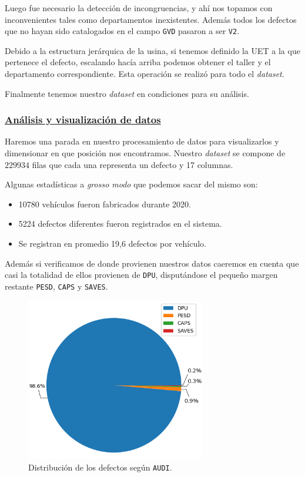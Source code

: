 \documentclass[a4paper,12pt]{article}
\begin{document}
Luego fue necesario la detección de incongruencias, y ahí nos topamos con inconvenientes tales como departamentos inexistentes. Además todos los defectos que no hayan sido catalogados en el campo \texttt{GVD} pasaron a ser \texttt{V2}.

Debido a la estructura jerárquica de la usina, si tenemos definido la UET a la que pertenece el defecto, escalando hacía arriba podemos obtener el taller y el departamento correspondiente. Esta operación se realizó para todo el \textit{dataset}.

Finalmente tenemos nuestro \textit{dataset} en condiciones para su análisis.

\subsubsection{\href{https://github.com/GeraCollante/tesis-icomp-machinelearning/blob/main/DataPlottingAndAnalysis.ipynb}{\color{blue}Análisis y visualización de datos}}
Haremos una parada en nuestro procesamiento de datos para visualizarlos y dimensionar en que posición nos encontramos.
Nuestro \textit{dataset} se compone de $229934$ filas que cada una representa un defecto y 17 columnas.

Algunas estadísticas a \textit{grosso modo} que podemos sacar del mismo son:

\begin{itemize}
	\item 10780 vehículos fueron fabricados durante 2020.
	\item 5224 defectos diferentes fueron registrados en el sistema.
	\item Se registran en promedio 19,6 defectos por vehículo.
\end{itemize}

Además si verificamos de donde provienen nuestros datos caeremos en cuenta que casi la totalidad de ellos provienen de \texttt{DPU}, disputándose el pequeño margen restante \texttt{PESD}, \texttt{CAPS} y \texttt{SAVES}.

\begin{figure}[H]
	\begin{center}				
	\includegraphics[width=0.7\textwidth]{audidist.png}
  	\caption{Distribución de los defectos según \texttt{AUDI}.}
  	\label{fig:distaudi}
  	\end{center}
\end{figure}
\end{document}
